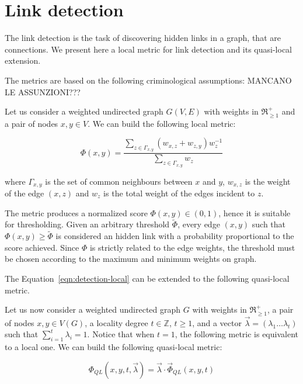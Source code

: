\section{Link detection}
\label{sec:link-detection}

The link detection is the task of discovering hidden links in a graph, that are connections.
We present here a local metric for link detection and its quasi-local extension.

The metrics are based on the following criminological assumptions: MANCANO LE ASSUNZIONI???

Let us consider a weighted undirected graph $G(V,E)$ with weights in $\Re_{\geq1}^{+}$ and a pair of nodes $x,y\in V$.
We can build the following local metric:


\begin{equation}
\label{eqn:detection-local}
\Phi(x,y)=
\frac{\sum\limits_{z\in\Gamma_{x,y}}(w_{x,z}+w_{z,y})w_{z}^{-1}}
{\sum\limits_{z\in\Gamma_{x,y}}w_{z}}
\end{equation}

where 
$\Gamma_{x,y}$ is the set of common neighbours between $x$ and $y$,
$w_{x,z}$ is the weight of the edge $(x,z)$ and
$w_{z}$ is the total weight of the edges incident to $z$.

The metric produces a normalized score $\Phi(x,y)\in(0,1)$, hence it is suitable for thresholding.
Given an arbitrary threshold $\tilde{\Phi}$, every edge $(x,y)$ such that $\Phi(x,y)\geq\tilde{\Phi}$ is considered an hidden link with a probability proportional to the score achieved.
Since $\Phi$ is strictly related to the edge weights, the threshold must be chosen according to the maximum and minimum weights on graph.

The Equation~\ref{eqn:detection-local} can be extended to the following quasi-local metric.

Let us now consider a weighted undirected graph $G$ with weights in $\Re_{\geq1}^{+}$, a pair of nodes $x,y\in V(G)$, a locality degree $t\in \mathbb{Z}$, $t\geq 1$, and a vector $\vec{\lambda}=(\lambda_{1}\ldots\lambda_{t})$ such that $\sum_{i=1}^{t}\lambda_{i}=1$. Notice that when $t=1$, the following metric is equivalent to a local one.
We can build the following quasi-local metric:

\begin{equation}
\label{eqn:detection-quasi-local-1}
\Phi_{QL}(x,y,t,\vec{\lambda})=\vec{\lambda}\cdot\vec{\Phi}_{QL}(x,y,t)
\end{equation}

